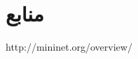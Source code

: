 \documentclass{article}
\begin{document}


\section*{منابع}
\renewcommand{\section}[2]{}%
\begin{thebibliography}{99} %


\begin{LTRitems}

\resetlatinfont

 http://mininet.org/overview/
\end{LTRitems}

\end{thebibliography}
\end{document}
